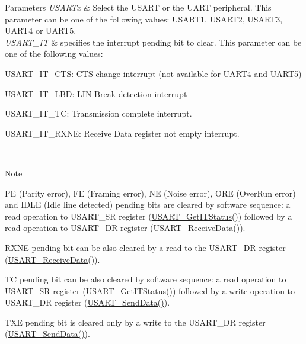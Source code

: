 \begin{DoxyParams}{Parameters}
{\em U\+S\+A\+R\+Tx} & Select the U\+S\+A\+RT or the U\+A\+RT peripheral. This parameter can be one of the following values\+: U\+S\+A\+R\+T1, U\+S\+A\+R\+T2, U\+S\+A\+R\+T3, U\+A\+R\+T4 or U\+A\+R\+T5. \\
\hline
{\em U\+S\+A\+R\+T\+\_\+\+IT} & specifies the interrupt pending bit to clear. This parameter can be one of the following values\+: \begin{DoxyItemize}
\item U\+S\+A\+R\+T\+\_\+\+I\+T\+\_\+\+C\+TS\+: C\+TS change interrupt (not available for U\+A\+R\+T4 and U\+A\+R\+T5) \item U\+S\+A\+R\+T\+\_\+\+I\+T\+\_\+\+L\+BD\+: L\+IN Break detection interrupt \item U\+S\+A\+R\+T\+\_\+\+I\+T\+\_\+\+TC\+: Transmission complete interrupt. \item U\+S\+A\+R\+T\+\_\+\+I\+T\+\_\+\+R\+X\+NE\+: Receive Data register not empty interrupt.\end{DoxyItemize}
\\
\hline
\end{DoxyParams}
\begin{DoxyNote}{Note}

\begin{DoxyItemize}
\item PE (Parity error), FE (Framing error), NE (Noise error), O\+RE (Over\+Run error) and I\+D\+LE (Idle line detected) pending bits are cleared by software sequence\+: a read operation to U\+S\+A\+R\+T\+\_\+\+SR register (\hyperlink{group___u_s_a_r_t___private___functions_ga93d8f031241bcdbe938d091a85295445}{U\+S\+A\+R\+T\+\_\+\+Get\+I\+T\+Status()}) followed by a read operation to U\+S\+A\+R\+T\+\_\+\+DR register (\hyperlink{group___u_s_a_r_t___private___functions_gac67a91845b0b1d54d31bdfb1c5e9867c}{U\+S\+A\+R\+T\+\_\+\+Receive\+Data()}).
\item R\+X\+NE pending bit can be also cleared by a read to the U\+S\+A\+R\+T\+\_\+\+DR register (\hyperlink{group___u_s_a_r_t___private___functions_gac67a91845b0b1d54d31bdfb1c5e9867c}{U\+S\+A\+R\+T\+\_\+\+Receive\+Data()}).
\item TC pending bit can be also cleared by software sequence\+: a read operation to U\+S\+A\+R\+T\+\_\+\+SR register (\hyperlink{group___u_s_a_r_t___private___functions_ga93d8f031241bcdbe938d091a85295445}{U\+S\+A\+R\+T\+\_\+\+Get\+I\+T\+Status()}) followed by a write operation to U\+S\+A\+R\+T\+\_\+\+DR register (\hyperlink{group___u_s_a_r_t___private___functions_ga0b43d42da9540f446d494bf69823c6fb}{U\+S\+A\+R\+T\+\_\+\+Send\+Data()}).
\item T\+XE pending bit is cleared only by a write to the U\+S\+A\+R\+T\+\_\+\+DR register (\hyperlink{group___u_s_a_r_t___private___functions_ga0b43d42da9540f446d494bf69823c6fb}{U\+S\+A\+R\+T\+\_\+\+Send\+Data()}). 
\end{DoxyItemize}
\end{DoxyNote}

